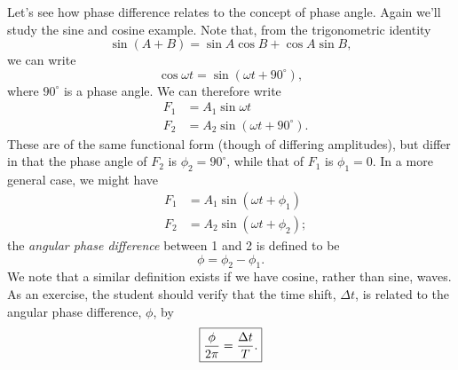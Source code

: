 Let's see how phase difference relates to the concept of phase angle. Again 
we'll study the sine and cosine example. Note that, from the trigonometric
identity
$$ \sin(A+B) = \sin A \cos B + \cos A \sin B, $$
we can write
$$ \cos\omega t = \sin (\omega t +90^\circ), $$
where $90^\circ$ is a phase angle.  We can therefore write
\begin{eqnarray*}
& F_1 & = A_1 \sin \omega t \nonumber \\
& F_2 & = A_2 \sin(\omega t+90^\circ).
\end{eqnarray*}
These are of the same functional form (though of differing amplitudes), but 
differ in that the phase angle of $F_2$ is $\phi_2=90^\circ$, while that of 
$F_1$ is $\phi_1=0$.  In a more general case, we might have
\begin{eqnarray*}
& F_1 & = A_1 \sin (\omega t+\phi_1) \nonumber \\
& F_2 & = A_2 \sin (\omega t + \phi_2);
\end{eqnarray*}
the {\it angular phase difference} between 1 and 2 is defined to be
$$ \phi=\phi_2-\phi_1.$$  
We note that a similar definition exists if we have cosine, rather than sine, 
waves. As an exercise, the student should verify that the time shift, 
$\Delta t$, is related to the angular phase difference, $\phi$, by
\begin{equation}
\fbox{$ \displaystyle \frac{\phi}{2\pi} = \frac{\Delta t}{T}.$} \label{eq:scope:angphase}
\end{equation}

